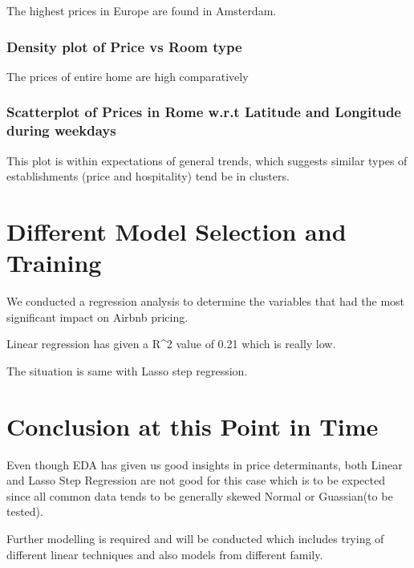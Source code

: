 \documentclass[
]{article}
\begin{document}
The highest prices in Europe are found in Amsterdam.

\hypertarget{density-plot-of-price-vs-room-type}{%
\subsubsection{Density plot of Price vs Room
type}\label{density-plot-of-price-vs-room-type}}

The prices of entire home are high comparatively

\hypertarget{scatterplot-of-prices-in-rome-w.r.t-latitude-and-longitude-during-weekdays}{%
\subsubsection{Scatterplot of Prices in Rome w.r.t Latitude and
Longitude during
weekdays}\label{scatterplot-of-prices-in-rome-w.r.t-latitude-and-longitude-during-weekdays}}

This plot is within expectations of general trends, which suggests
similar types of establishments (price and hospitality) tend be in
clusters.

\hypertarget{different-model-selection-and-training}{%
\section{Different Model Selection and
Training}\label{different-model-selection-and-training}}

We conducted a regression analysis to determine the variables that had
the most significant impact on Airbnb pricing.

Linear regression has given a R\^{}2 value of 0.21 which is really low.

The situation is same with Lasso step regression.

\hypertarget{conclusion-at-this-point-in-time}{%
\section{Conclusion at this Point in
Time}\label{conclusion-at-this-point-in-time}}

Even though EDA has given us good insights in price determinants, both
Linear and Lasso Step Regression are not good for this case which is to
be expected since all common data tends to be generally skewed Normal or
Guassian(to be tested).

Further modelling is required and will be conducted which includes
trying of different linear techniques and also models from different
family.
\end{document}
